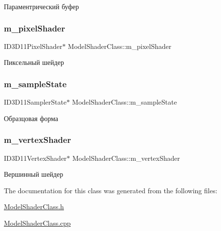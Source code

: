 Параментрический буфер 

\mbox{\label{class_model_shader_class_a98386d05b75e06bcc4671f16d413d2a4}} 
\subsubsection{\texorpdfstring{m\+\_\+pixel\+Shader}{m\_pixelShader}}
{\footnotesize\ttfamily I\+D3\+D11\+Pixel\+Shader$\ast$ Model\+Shader\+Class\+::m\+\_\+pixel\+Shader\hspace{0.3cm}{\ttfamily [private]}}



Пиксельный шейдер 

\mbox{\label{class_model_shader_class_a6b6ed136ba9c1252d21bcac7100f431b}} 
\subsubsection{\texorpdfstring{m\+\_\+sample\+State}{m\_sampleState}}
{\footnotesize\ttfamily I\+D3\+D11\+Sampler\+State$\ast$ Model\+Shader\+Class\+::m\+\_\+sample\+State\hspace{0.3cm}{\ttfamily [private]}}



Образцовая форма 

\mbox{\label{class_model_shader_class_a777f211c55c31fee5facf4b579856de3}} 
\subsubsection{\texorpdfstring{m\+\_\+vertex\+Shader}{m\_vertexShader}}
{\footnotesize\ttfamily I\+D3\+D11\+Vertex\+Shader$\ast$ Model\+Shader\+Class\+::m\+\_\+vertex\+Shader\hspace{0.3cm}{\ttfamily [private]}}



Вершинный шейдер 



The documentation for this class was generated from the following files\+:\begin{DoxyCompactItemize}
\item 
\hyperlink{_model_shader_class_8h}{Model\+Shader\+Class.\+h}\item 
\hyperlink{_model_shader_class_8cpp}{Model\+Shader\+Class.\+cpp}\end{DoxyCompactItemize}
